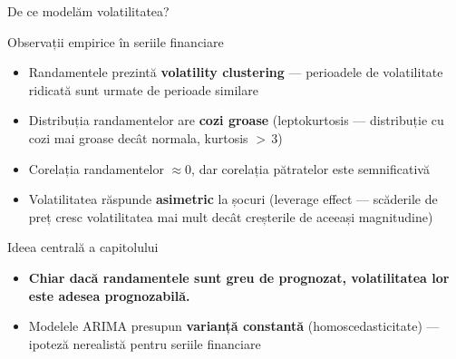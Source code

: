 \documentclass[9pt, aspectratio=169, t]{beamer}
\begin{document}
\begin{frame}{De ce modelăm volatilitatea?}
    \small
        \begin{block}{Observații empirice în seriile financiare}
            \begin{itemize}
                \item Randamentele prezintă \textbf{volatility clustering} --- perioadele de volatilitate ridicată sunt urmate de perioade similare
                \item Distribuția randamentelor are \textbf{cozi groase} (leptokurtosis --- distribuție cu cozi mai groase decât normala, kurtosis ${>}\,3$)
                \item Corelația randamentelor $\approx 0$, dar corelația pătratelor este semnificativă
                \item Volatilitatea răspunde \textbf{asimetric} la șocuri (leverage effect --- scăderile de preț cresc volatilitatea mai mult decât creșterile de aceeași magnitudine)
            \end{itemize}
        \end{block}
        \vspace{0.2cm}
        \begin{alertblock}{Ideea centrală a capitolului}
            \begin{itemize}
                \item \textbf{Chiar dacă randamentele sunt greu de prognozat, volatilitatea lor este adesea prognozabilă.}
                \item Modelele ARIMA presupun \textbf{varianță constantă} (homoscedasticitate) --- ipoteză nerealistă pentru seriile financiare
            \end{itemize}
        \end{alertblock}
\end{frame}
\end{document}
